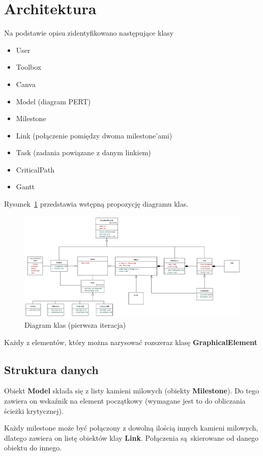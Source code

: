\section{Architektura}
Na podstawie opisu zidentyfikowano następujące klasy
\begin{itemize}
	\item User
	\item Toolbox
	\item Canva
	\item Model (diagram PERT)
	\item Milestone
	\item Link (połączenie pomiędzy dwoma milestone'ami)
	\item Task (zadania powiązane z danym linkiem)
	\item CriticalPath
	\item Gantt
\end{itemize}

Rysunek~\ref{fig:klasy} przedstawia wstępną propozycję diagramu klas. 
\begin{figure}[h]
	\centering
	\includegraphics[width=1\linewidth]{img/klasy}
	\caption[Diagram klas]{Diagram klas (pierwsza iteracja)}
	\label{fig:klasy}
\end{figure}

Każdy z elementów, który można narysować rozszeraz klasę \textbf{GraphicalElement}

\subsection{Struktura danych}
Obiekt \textbf{Model} składa się z listy kamieni milowych (obiekty \textbf{Milestone}). Do tego zawiera on wskaźnik na element początkowy (wymagane jest to do obliczania ścieżki krytycznej).

Każdy milestone może być połączony z dowolną ilością innych kamieni milowych, dlatego zawiera on listę obiektów klay \textbf{Link}. Połączenia są skierowane od danego obiektu do innego.

